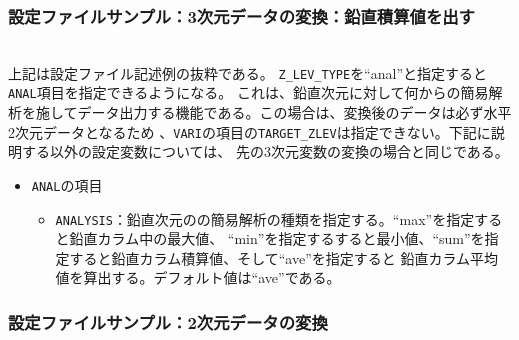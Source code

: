 \subsubsection{設定ファイルサンプル：3次元データの変換：鉛直積算値を出す}

\\

\noindent 上記は設定ファイル記述例の抜粋である。
\verb|Z_LEV_TYPE|を``anal''と指定すると
\verb|ANAL|項目を指定できるようになる。
これは、鉛直次元に対して何からの簡易解析を施してデータ出力する機能である。この場合は、変換後のデータは必ず水平2次元データとなるため
、\verb|VARI|の項目の\verb|TARGET_ZLEV|は指定できない。下記に説明する以外の設定変数については、
先の3次元変数の変換の場合と同じである。
\begin{itemize}
 \item \verb|ANAL|の項目
 \begin{itemize}
  \item \verb|ANALYSIS|：鉛直次元のの簡易解析の種類を指定する。``max''を指定すると鉛直カラム中の最大値、
        ``min''を指定するすると最小値、``sum''を指定すると鉛直カラム積算値、そして``ave''を指定すると
        鉛直カラム平均値を算出する。デフォルト値は``ave''である。
 \end{itemize}
\end{itemize}


\subsubsection{設定ファイルサンプル：2次元データの変換}

